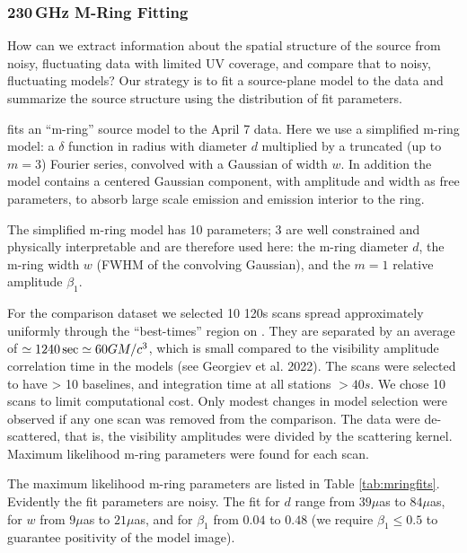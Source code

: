 \subsubsection{230\,GHz M-Ring Fitting}

How can we extract information about the spatial structure of the source from noisy, fluctuating data with limited UV coverage, and compare that to noisy, fluctuating models? Our strategy is to fit a source-plane model to the data and summarize the source structure using the distribution of fit parameters.

 fits an ``m-ring'' source model to the April 7 data.  Here we use a simplified m-ring model: a $\delta$ function in radius with diameter $d$ multiplied by a truncated (up to $m = 3$) Fourier series, convolved with a Gaussian of width $w$.  In addition the model contains a centered Gaussian component, with amplitude and width as free parameters, to absorb large scale emission and emission interior to the ring.

The simplified m-ring model has 10 parameters; 3 are well constrained and physically interpretable and are therefore used here: the m-ring diameter $d$, the m-ring width $w$ (FWHM of the convolving  Gaussian), and the $m=1$ relative amplitude $\beta_1$.

For the comparison dataset we selected 10 120s scans spread approximately uniformly through the ``best-times'' region on \aprilvii.  They are separated by an average of $\simeq 1240\sec \simeq 60 GM/c^3$, which is small compared to the visibility amplitude correlation time in the models (see Georgiev et al. 2022). The scans were selected to have > 10 baselines, and integration time at all stations $> 40s$.  We chose 10 scans to limit computational cost.   Only modest changes in model selection were observed if any one scan was removed from the comparison.  The data were de-scattered, that is, the visibility amplitudes were divided by the scattering kernel.  Maximum likelihood m-ring parameters were found for each scan.

The maximum likelihood m-ring parameters are listed in Table \ref{tab:mringfits}.  Evidently the fit parameters are noisy.  The fit for $d$ range from $39\mu$as to $84\mu$as, for $w$ from $9\mu$as to $21\mu$as, and for $\beta_1$ from $0.04$ to $0.48$ (we require $\beta_1 \le 0.5$ to guarantee  positivity of the model image).

